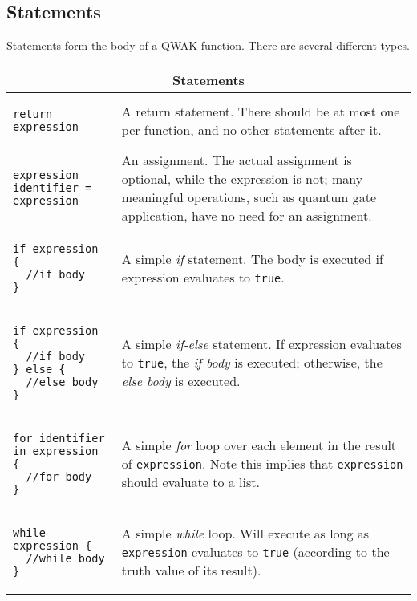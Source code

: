 \documentclass{article}
\begin{document}
\pagebreak

\subsection{Statements}

Statements form the body of a QWAK function. There are several different types.

\begin{center}
\begin{tabular}{| l | m{8cm} |}
\hline
\multicolumn{2}{|c|}{\textbf{Statements}} \\ \hline
\begin{lstlisting}
return expression
\end{lstlisting} & A return statement. There should be at most one per function, and no other statements after it. \\ \hline
\begin{lstlisting}
expression
identifier = expression
\end{lstlisting} & An assignment. The actual assignment is optional, while the expression is not; many meaningful operations, such as quantum gate application, have no need for an assignment. \\ \hline
\begin{lstlisting}
if expression {
  //if body
}
\end{lstlisting} & A simple \textit{if} statement. The body is executed if expression evaluates to \lstinline$true$. \\ \hline
\begin{lstlisting}
if expression {
  //if body
} else {
  //else body
}
\end{lstlisting} & A simple \textit{if-else} statement. If expression evaluates to \lstinline$true$, the \textit{if body} is executed; otherwise, the \textit{else body} is executed. \\ \hline
\begin{lstlisting}
for identifier in expression {
  //for body
}
\end{lstlisting} & A simple \textit{for} loop over each element in the result of \lstinline$expression$. Note this implies that \lstinline$expression$ should evaluate to a list. \\ \hline
\begin{lstlisting}
while expression {
  //while body
}
\end{lstlisting} & A simple \textit{while} loop. Will execute as long as \lstinline$expression$ evaluates to \lstinline$true$ (according to the truth value of its result). \\ \hline
\end{tabular}
\end{center}
\end{document}
